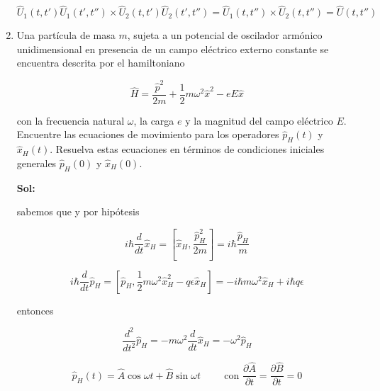 \documentclass[12pt,a4paper]{article}
\begin{document}
\begin{enumerate}
\begin{equation*}
    \hat{U}_{1}(t,t') \hat{U}_{1}(t',t'') \times \hat{U}_{2}(t,t') \hat{U}_{2}(t',t'') = \hat{U}_{1}(t,t'') \times \hat{U}_2 (t,t'')= \hat{U}(t,t'')
\end{equation*}






\item Una partícula de masa $m$, sujeta a un potencial de oscilador armónico unidimensional en presencia de un campo eléctrico externo constante se encuentra descrita por el hamiltoniano

\begin{equation*}
    \hat{H} = \frac{\hat{p}^2}{2m} + \frac{1}{2} m \omega ^2 \hat{x}^2 - e E\hat{x}
\end{equation*}

con la frecuencia natural $\omega$, la carga $e$ y la magnitud del campo eléctrico $E$. Encuentre las ecuaciones de movimiento para los operadores $\hat{p}_{H}(t)$ y $\hat{x}_{H}(t)$. Resuelva estas ecuaciones en términos de condiciones iniciales generales $\hat{p}_{H} (0)$ y $\hat{x}_{H}(0)$.

\textbf{Sol:} 

 sabemos que y por hipótesis

\begin{equation*}
    i \hbar \frac{d}{dt} \hat{x}_{H} = [\hat{x}_{H}, \frac{\hat{p}_{H}^{2}}{2m}] = i \hbar \frac{\hat{p}_{H}}{m}
\end{equation*}

\begin{equation*}
    i \hbar \frac{d}{dt} \hat{p}_{H} =  [\hat{p}_{H},\frac{1}{2}m \omega^2 \hat{x}_{H}^{2} - q \epsilon \hat{x}_{H}] = - i \hbar m \omega ^2 \hat{x}_{H}+ i \hbar q \epsilon
\end{equation*}

entonces

\begin{equation*}
    \frac{d^2}{dt^2} \hat{p}_{H} = - m \omega^2 \frac{d}{dt} \hat{x}_{H} = - \omega^2 \hat{p}_{H}
\end{equation*}

\begin{equation*}
    \hat{p}_{H} (t) = \hat{A} \cos{\omega t} + \hat{B} \sin{\omega t} \hspace{1cm} \text{con } \frac{\partial \hat{A}}{\partial t} = \frac{\partial \hat{B}}{\partial t} = 0 
    \end{equation*}
    

\end{enumerate}
\end{document}
